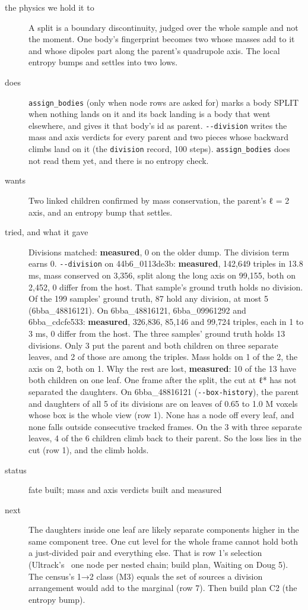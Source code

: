 \begin{description}
\item[{the physics we hold it to}] A split is a boundary discontinuity, judged over the whole sample and not the moment. One body's fingerprint becomes two whose masses add to it and whose dipoles part along the parent's quadrupole axis. The local entropy bumps and settles into two lows.
\item[{does}] \texttt{assign\_\allowbreak{}bodies} (only when node rows are asked for) marks a body SPLIT when nothing lands on it and its back landing is a body that went elsewhere, and gives it that body's id as parent. \texttt{-\allowbreak{}-\allowbreak{}division} writes the mass and axis verdicts for every parent and two pieces whose backward climbs land on it (the \texttt{division} record, 100 steps). \texttt{assign\_\allowbreak{}bodies} does not read them yet, and there is no entropy check.
\item[{wants}] Two linked children confirmed by mass conservation, the parent's ℓ = 2 axis, and an entropy bump that settles.
\item[{tried, and what it gave}] Divisions matched: \textbf{measured}, 0 on the older dump. The division term earns 0. \texttt{-\allowbreak{}-\allowbreak{}division} on 44b6\_\allowbreak{}0113de3b: \textbf{measured}, 142,649 triples in 13.8 ms, mass conserved on 3,356, split along the long axis on 99,155, both on 2,452, 0 differ from the host. That sample's ground truth holds no division. Of the 199 samples' ground truth, 87 hold any division, at most 5 (6bba\_\allowbreak{}48816121). On 6bba\_\allowbreak{}48816121, 6bba\_\allowbreak{}09961292 and 6bba\_\allowbreak{}cdcfe533: \textbf{measured}, 326,836, 85,146 and 99,724 triples, each in 1 to 3 ms, 0 differ from the host. The three samples' ground truth holds 13 divisions. Only 3 put the parent and both children on three separate leaves, and 2 of those are among the triples. Mass holds on 1 of the 2, the axis on 2, both on 1. Why the rest are lost, \textbf{measured}: 10 of the 13 have both children on one leaf. One frame after the split, the cut at ℓ* has not separated the daughters. On 6bba\_\allowbreak{}48816121 (\texttt{-\allowbreak{}-\allowbreak{}box-\allowbreak{}history}), the parent and daughters of all 5 of its divisions are on leaves of 0.65 to 1.0 M voxels whose box is the whole view (row 1). None has a node off every leaf, and none falls outside consecutive tracked frames. On the 3 with three separate leaves, 4 of the 6 children climb back to their parent. So the loss lies in the cut (row 1), and the climb holds.
\item[{status}] fate built; mass and axis verdicts built and measured
\item[{next}] The daughters inside one leaf are likely separate components higher in the same component tree. One cut level for the whole frame cannot hold both a just-divided pair and everything else. That is row 1's selection (Ultrack's~\cite{src:Ultrack} one node per nested chain; build plan, Waiting on Doug 5). The census's 1→2 class (M3) equals the set of sources a division arrangement would add to the marginal (row 7). Then build plan C2 (the entropy bump).
\end{description}

